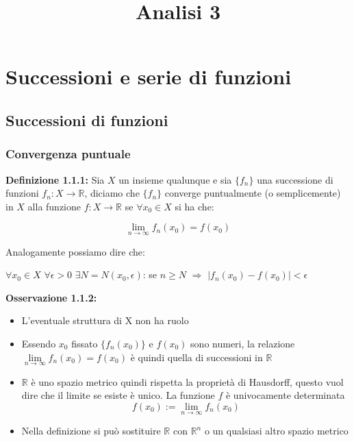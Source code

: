 \documentclass[a4paper,11pt,titlepage]{book}
\title{Analisi 3}
\begin{document}
\maketitle

\tableofcontents

\chapter{Successioni e serie di funzioni}

\section{Successioni di funzioni}

\subsection{Convergenza puntuale}

\textbf{Definizione 1.1.1:} Sia $X$ un insieme qualunque e sia $\{f_{n}\}$ una successione di funzioni $f_{n}:X\rightarrow\mathbb{R}$, diciamo che $\{f_{n}\}$ converge puntualmente (o semplicemente) in $X$ alla funzione $f:X\rightarrow\mathbb{R}$ se $\forall{x_{0}}\in{X}$ si ha che:\begin{center} \nointerlineskip \[\lim_{n \to \infty}{f_{n}(x_{0})}=f(x_{0})\]\end{center}Analogamente possiamo dire che:
\begin{center}
 $\forall{x_{0}}\in{X}$ $\forall{\epsilon{>0}}$ $\exists{N}=N(x_{0},\epsilon)$: se $n\geq{N}$ $\Rightarrow$ $|f_{n}(x_{0})-f(x_{0})|<\epsilon$ \\
 \end{center} 
 

\textbf{Osservazione 1.1.2:} \begin{itemize}
\item L'eventuale struttura di X non ha ruolo
\item Essendo $x_0$ fissato $\{f_{n}(x_0)\}$ e $f(x_0)$ sono numeri, la relazione $\lim\limits_{n\to\infty}f_n(x_0)=f(x_0)$ è quindi quella di successioni in $\mathbb{R}$
\item $\mathbb{R}$ è uno spazio metrico quindi rispetta la proprietà di Hausdorff, questo vuol dire che il limite se esiste è unico. La funzione $f$ è univocamente determinata  $$f(x_{0}):=\lim_{n \to \infty}{f_{n}}(x_{0})$$
\item Nella definizione si può sostituire $\mathbb{R}$ con $\mathbb{R}^n$ o un qualsiasi altro spazio metrico
\end{itemize}
\end{document}
